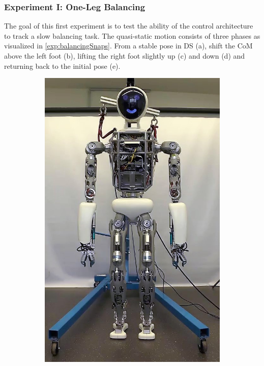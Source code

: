 \subsubsection{Experiment I: One-Leg Balancing}
The goal of this first experiment is to test the ability of the control architecture to track a slow balancing task. The quasi-static motion consists of three phases as visualized in \cref{exp:balancingSnaps}. From a stable pose in \gls{DS} (a), shift the \gls{CoM} above the left foot (b), lifting the right foot slightly up (c) and down (d) and returning back to the initial pose (e).
\begin{figure}[h!]
\begin{subfigure}{.2\textwidth}
	\includegraphics[width=.95\linewidth]{experiments/balancing/snaps/1}

\end{subfigure}
\end{figure}

